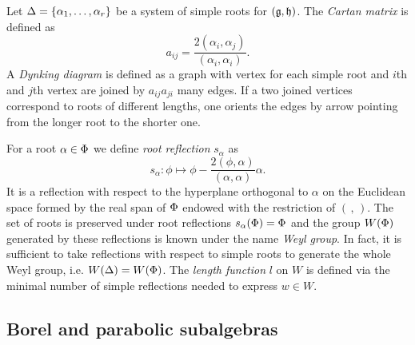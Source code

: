 Let $\Delta=\{ \alpha_1, \ldots, \alpha_r \}$ be a system of simple roots for $(\mathfrak{g},\mathfrak{h})$. The \emph{Cartan matrix} is defined as
\[
 a_{ij} =\frac{2(\alpha_i,\alpha_j)}{(\alpha_i,\alpha_i)}.
\]
A \emph{Dynking diagram} is defined as a graph with vertex for each simple root and $i$th and $j$th vertex are joined by $a_{ij}a_{ji}$ many edges. If a two joined vertices correspond to roots of different lengths, one orients the edges by arrow pointing from the longer root to the shorter one.


For a root $\alpha \in \Phi$ we define \emph{root reflection} $s_\alpha$ as
\[
 s_\alpha: \phi \mapsto \phi - \frac{2(\phi,\alpha)}{(\alpha,\alpha)}\alpha.
\] It is a reflection with respect to the hyperplane orthogonal to $\alpha$ on the Euclidean space formed by the real span of $\Phi$ endowed with the restriction of $(\, , \,)$. The set of roots is preserved under root reflections \( s_\alpha(\Phi) = \Phi\) and the group $W(\Phi)$ generated by these reflections is known under the name \emph{Weyl group}. In fact, it is sufficient to take reflections with respect to simple roots to generate the whole Weyl group, i.e. $W(\Delta) = W(\Phi)$. The \emph{length function} $l$ on $W$ is defined via the minimal number of simple reflections needed to express $w \in W$. 

\subsection{Borel and parabolic subalgebras}

